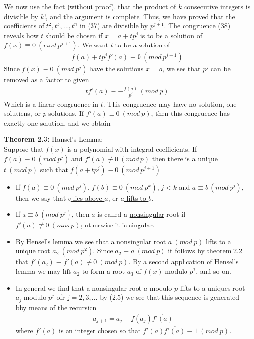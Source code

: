 \documentclass[a4paper]{article}
\begin{document}
\begin{itemize}
    We now use the fact (without proof), that the product of $k$ consecutive integers is divisible by $k!$, and the argument is complete. Thus, we have proved that the coefficients of $t^2, t^3,..., t^n$ in (37) are divisible by $p^{j+1}$. The congruence (38) reveals how $t$ should be chosen if $x=a+tp^j$ is to be a solution of $f(x)\equiv 0\ (mod\ p^{j+1})$. We want $t$ to be a solution of
    \begin{align}
        f(a)+tp^jf'(a)\equiv 0\ (mod\ p^{j+1})
    \end{align}
    Since $f(x)\equiv 0\ (mod\ p^j)$ have the solutions $x=a$, we see that $p^j$ can be removed as a factor to given
    \begin{align}
        tf'(a)\equiv -\frac{f(a)}{p^j}\ (mod\ p)
    \end{align}
    Which is a linear congruence in $t$. This congruence may have no solution, one solutions, or $p$ solutions. If $f'(a)\equiv 0\ (mod\ p)$, then this congruence has exactly one solution, and we obtain
\end{itemize}

\textbf{Theorem 2.3:} Hansel's Lemma:\\
Suppose that $f(x)$ is a polynomial with integral coefficients. If $f(a)\equiv0\ (mod\ p^j)$ and $f'(a)\not\equiv0\ (mod\ p)$ then there is a unique $t\ (mod\ p)$ such that $f(a+tp^j)\equiv0\ (mod\ p^{j+1})$

\begin{itemize}
    \item If $f(a)\equiv0\ (mod\ p^j)$, $f(b)\equiv 0\ (mod\ p^k)$, $j<k$ and $a\equiv b\ (mod\ p^j)$, then we say that \underline{$b$ lies above $a$}, or \underline{$a$ lifts to $b$}.
    \item If $a\equiv b\ (mod\ p^j)$, then $a$ is called a \underline{nonsingular} root if $f'(a)\not\equiv 0\ (mod\ p)$; otherwise it is \underline{singular}.
    \item By Hensel's lemma we see that a nonsingular root $a\ (mod\ p)$ lifts to a unique root $a_2\ (mod\ p^2)$. Since $a_2\equiv a\ (mod\ p)$ it follows by theorem 2.2 that $f'(a_2)\equiv f'(a)\not\equiv 0\ (mod\ p)$. By a second application of Hensel's lemma we may lift $a_2$ to form a root $a_3$ of $f(x)$ modulo $p^3$, and so on.
    \item In general we find that a nonsingular root $a$ modulo $p$ lifts to a uniques root $a_j$ modulo $p^j$ ofr $j=2,3,...$ by (2.5) we see that this sequence is generated bby means of the recursion
    \begin{align}
        a_{j+1} = a_j-f(a_j)\overline{f'(a)}
    \end{align}
    where $f'(a)$ is an integer chosen so that $f'(a)\overline{f'(a)}\equiv 1\ (mod\ p)$.
\end{itemize}
\end{document}
